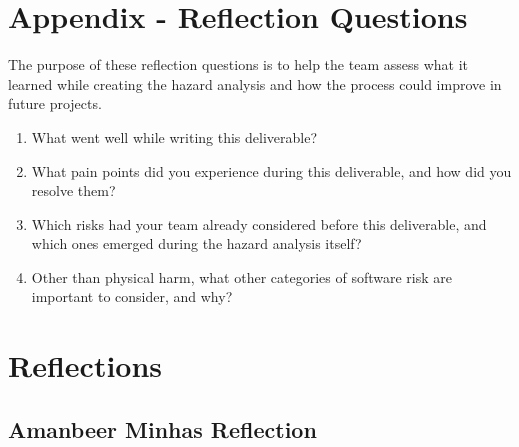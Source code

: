 \documentclass[12pt]{article}
\begin{document}
\clearpage

\section*{Appendix - Reflection Questions}

The purpose of these reflection questions is to help the team assess what it
learned while creating the hazard analysis and how the process could improve
in future projects.

\begin{enumerate}
  \item What went well while writing this deliverable?
  \item What pain points did you experience during this deliverable, and how
  did you resolve them?
  \item Which risks had your team already considered before this deliverable,
  and which ones emerged during the hazard analysis itself?
  \item Other than physical harm, what other categories of software risk are
  important to consider, and why?
\end{enumerate}

\section{Reflections}

\subsection{Amanbeer Minhas Reflection}
\end{document}
